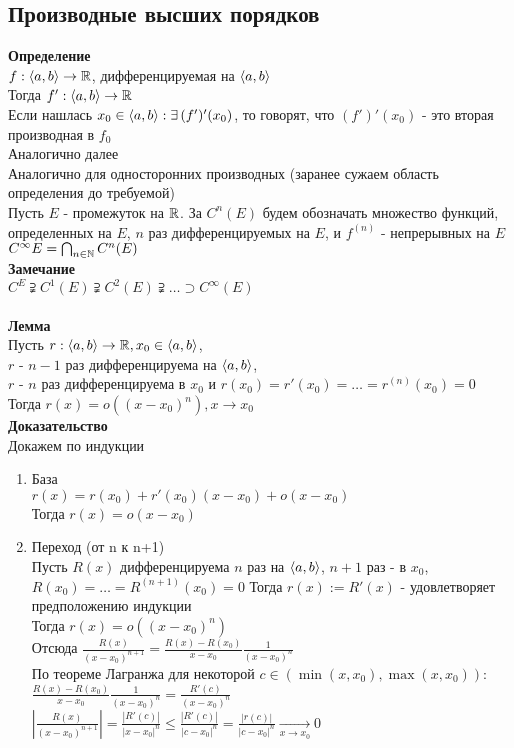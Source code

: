 \documentclass[12pt]{article}
\begin{document}
\subsection{Производные высших порядков}
\textbf{Определение}\\
$f:\langle a,b \rangle \rightarrow \mathbb{R}$, дифференцируемая на $\langle a,b \rangle$\\
Тогда $f':\langle a, b\rangle \rightarrow \mathbb{R}$\\
Если нашлась $x_0\in\langle a,b\rangle: \exists\,(f')'(x_0)$, то говорят, что $(f')'(x_0)$ - это вторая производная в $f_0$\\
Аналогично далее\\
Аналогично для односторонних производных (заранее сужаем область определения до требуемой)\\
Пусть $E$ - промежуток на $\mathbb{R}$. За $C^n(E)$ будем обозначать множество функций, определенных на $E$, $n$ раз дифференцируемых на $E$, и $f^{(n)}$ - непрерывных на $E$\\
$C^\infty E = \bigcap_{n\in \mathbb{N}} C^n(E)$\\
\textbf{Замечание}\\
$C^E \supsetneqq C^1(E) \supsetneqq C^2(E) \supsetneqq \ldots \supset C^\infty(E)$\\\\
\textbf{Лемма}\\
Пусть $r: \langle a,b \rangle \rightarrow \mathbb{R}, x_0 \in \langle a, b \rangle$, \\
$r$ - $n-1$ раз дифференцируема на $\langle a, b \rangle$, \\
$r$ - $n$ раз дифференцируема в $x_0$ и $r(x_0) = r'(x_0) = \ldots = r^{(n)}(x_0) = 0$\\
Тогда $r(x) = o((x-x_0)^n), x \rightarrow x_0$\\
\textbf{Доказательство}\\
Докажем по индукции
\begin{enumerate}
    \item База\\
    $r(x) = r(x_0) + r'(x_0)(x-x_0) + o(x-x_0)$\\
    Тогда $r(x) = o(x-x_0)$
    \item Переход (от n к n+1)\\
    Пусть $R(x)$ дифференцируема $n$ раз на $\langle a, b \rangle$, $n+1$ раз - в $x_0$, $R(x_0) = \ldots = R^{(n+1)} (x_0) = 0$
    Тогда $r(x):= R'(x)$ - удовлетворяет предположению индукции\\
    Тогда $r(x) = o((x-x_0)^n)$\\
    Отсюда $\frac{R(x)}{(x-x_0)^{n+1}} = \frac{R(x)-R(x_0)}{x-x_0} \frac{1}{(x-x_0)^n}$\\
    По теореме Лагранжа для некоторой $c \in (\min(x, x_0), \max(x, x_0))$:\\
    $\frac{R(x)-R(x_0)}{x-x_0} \frac{1}{(x-x_0)^n} = \frac{R'(c)}{(x-x_0)^n}$\\
    $|\frac{R(x)}{(x-x_0)^{n+1}}| = \frac{|R'(c)|}{|x-x_0|^n} \leq \frac{|R'(c)|}{|c-x_0|^n} = \frac{|r(c)|}{|c-x_0|^n} \xrightarrow[x\rightarrow x_0]{} 0$
\end{enumerate}
\end{document}
